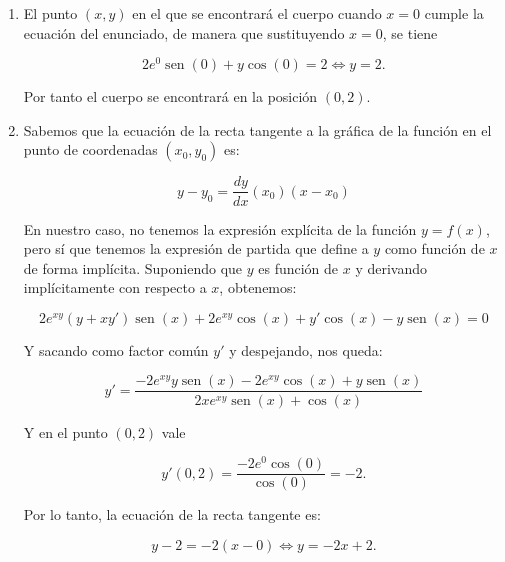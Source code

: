 \documentclass[
  spanish,
  a4paper,
]{scrreport}
\theoremstyle{definition}
\theoremstyle{remark}
\begin{document}
\begin{tcolorbox}[enhanced jigsaw, arc=.35mm, bottomrule=.15mm, bottomtitle=1mm, breakable, colback=white, colbacktitle=quarto-callout-tip-color!10!white, colframe=quarto-callout-tip-color-frame, coltitle=black, left=2mm, leftrule=.75mm, opacityback=0, opacitybacktitle=0.6, rightrule=.15mm, title=\textcolor{quarto-callout-tip-color}{\faLightbulb}\hspace{0.5em}{Solución}, titlerule=0mm, toprule=.15mm, toptitle=1mm]

\begin{enumerate}
\def\labelenumi{\alph{enumi}.}
\item
  El punto \((x,y)\) en el que se encontrará el cuerpo cuando \(x=0\)
  cumple la ecuación del enunciado, de manera que sustituyendo \(x=0\),
  se tiene

  \[
   2e^0 \operatorname{sen}(0) + y \cos(0) = 2 \Leftrightarrow y = 2.
   \]

  Por tanto el cuerpo se encontrará en la posición \((0,2)\).
\item
  Sabemos que la ecuación de la recta tangente a la gráfica de la
  función en el punto de coordenadas \((x_0,y_0)\) es:

  \[
   y-y_0=\frac{dy}{dx}(x_0)(x-x_0)
   \]

  En nuestro caso, no tenemos la expresión explícita de la función
  \(y=f(x)\), pero sí que tenemos la expresión de partida que define a
  \(y\) como función de \(x\) de forma implícita. Suponiendo que \(y\)
  es función de \(x\) y derivando implícitamente con respecto a \(x\),
  obtenemos:

  \[
   2 e^{xy}(y + xy')\operatorname{sen}(x) + 2e^{xy}\cos(x) + y'\cos(x) - y\operatorname{sen}(x) = 0
   \]

  Y sacando como factor común \(y'\) y despejando, nos queda:

  \[
   y' = \frac{{ - 2e^{xy} y \operatorname{sen}(x) - 2e^{xy} \cos(x) + y \operatorname{sen}(x)}}{{2xe^{xy} \operatorname{sen}(x) + \cos(x)}}
   \]

  Y en el punto \((0,2)\) vale

  \[
   y'(0,2) = \frac{{-2e^0 \cos(0)}}{{\cos(0)}} = -2.
   \]

  Por lo tanto, la ecuación de la recta tangente es:

  \[
   y-2=-2(x-0)\Leftrightarrow y=-2x+2.
   \]
\end{enumerate}

\end{tcolorbox}
\end{document}
